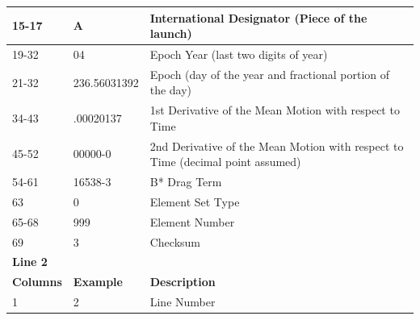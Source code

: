\documentclass[12pt]{report}
\begin{document}
\begin{table}[h!]
{\begin{tabular}{|l|l|l|}
				15-17                                   & A                                       & International Designator (Piece of the launch)                                  \\ \hline
				19-32                                   & 04                                      & Epoch Year (last two digits of year)                                            \\ \hline
				21-32                                   & 236.56031392                            & Epoch (day of the year and fractional portion of the day)                       \\ \hline
				34-43                                   & .00020137                               & 1st Derivative of the Mean Motion with respect to Time                          \\ \hline
				45-52                                   & 00000-0                                 & 2nd Derivative of the Mean Motion with respect to Time (decimal point assumed)  \\ \hline
				54-61                                   & 16538-3                                 & B* Drag Term                                                                    \\ \hline
				63                                      & 0                                       & Element Set Type                                                                \\ \hline
				65-68                                   & 999                                     & Element Number                                                                  \\ \hline
				69                                      & 3                                       & Checksum                                                                        \\ \hline
				\multicolumn{3}{|l|}{\textbf{Line 2}}                                                                                                                               \\ \hline
				\rowcolor[HTML]{333333} 
				{\color[HTML]{FFFFFF} \textbf{Columns}} & {\color[HTML]{FFFFFF} \textbf{Example}} & {\color[HTML]{FFFFFF} \textbf{Description}}                                     \\ \hline
				1                                       & 2                                       & Line Number                                                                     \\ \hline

\end{tabular}}
\end{table}
\end{document}
